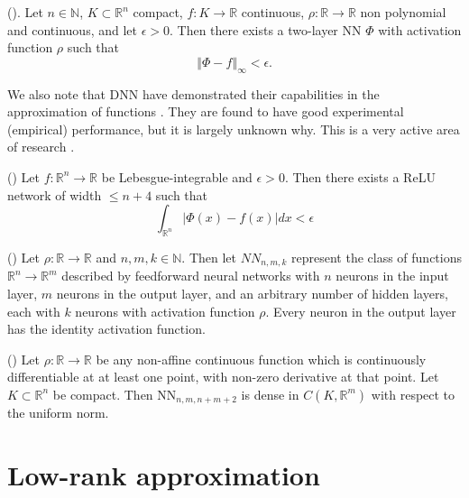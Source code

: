 \begin{theorem}
(\cite{cybenko1989approximation,hornik1991approximation,pinkus1999approximation}). Let $n\in\mathbb{N}$, $K\subset\mathbb{R}^{n}$ compact, $f:K\rightarrow\mathbb{R}$ continuous, $\rho:\mathbb{R}\rightarrow\mathbb{R}$ non polynomial and continuous, and let $\epsilon>0$. Then there exists a
two-layer NN $\Phi$ with activation function $\rho$ such that
\[
\left\Vert \Phi-f\right\Vert _{\infty}<\epsilon.
\]
\end{theorem}

We also note that DNN have demonstrated their capabilities in the approximation of functions \citep{liang2016deep,yarotsky2017error,fan2020universal}. They are found to have good experimental (empirical) performance, but it is largely unknown why. This is a very active area of research \cite{caterini2018deep}.

\begin{theorem}
(\cite{lu2017expressive}) Let  $f:\mathbb{R}^{n}\rightarrow\mathbb{R}$ be Lebesgue-integrable and $\epsilon>0$. Then there exists a ReLU
network of width $\leq n+4$ such that
\[
\int_{\mathbb{R}^{n}}\left\vert \Phi\left(  x\right)  -f\left(  x\right)  \right\vert dx<\epsilon
\]

\end{theorem}

\begin{definition}
(\cite{kidger2020universal}) Let $\rho:\mathbb{R}\rightarrow\mathbb{R}$ and $n,m,k\in\mathbb{N}$. Then let $NN_{n,m,k}$ represent the class of functions $\mathbb{R}^{n}\rightarrow\mathbb{R}^{m}$ described by feedforward neural networks with $n$ neurons in the input layer, $m$ neurons in the output layer, and an arbitrary number of hidden layers, each with $k$ neurons with activation function $\rho$. Every neuron in the output layer has the identity activation function.
\end{definition}

\begin{theorem}
(\cite{kidger2020universal}) Let $\rho:\mathbb{R}\rightarrow\mathbb{R}$ be any non-affine continuous function which is continuously differentiable at
at least one point, with non-zero derivative at that point. Let $K\subset\mathbb{R}^{n}$ be compact. Then NN$_{n,m,n+m+2}$ is dense in $C\left(  K,\mathbb{R}^{m}\right)$ with respect to the uniform norm.
\end{theorem}


\section{Low-rank approximation}


